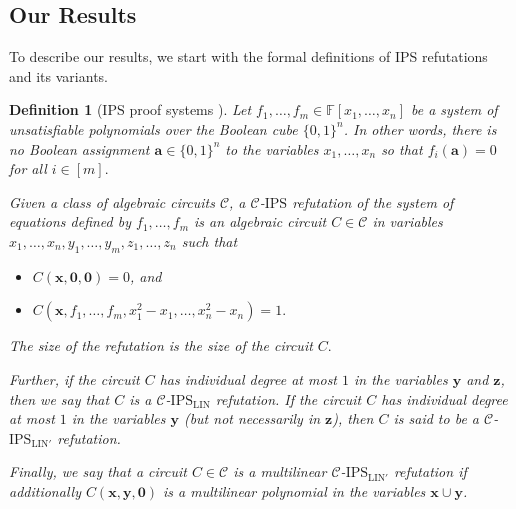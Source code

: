 \documentclass[11pt]{article}
\newtheorem{definition}[theorem]{Definition}
\newcommand{\Boo}{\{0,1 \}}
\newcommand{\F}{\mathbb{F}}
\newcommand{\IPS}{\mathrm{IPS}}
\newcommand{\IPSLIN}{\mathrm{IPS}_{\mathrm{LIN}}}
\newcommand{\IPSLINp}{\mathrm{IPS}_{\mathrm{LIN}'}}
\begin{document}

    
    
    
    








\subsection{Our Results}
\label{sec:results}
To describe our results, we start with the formal definitions of IPS refutations and its variants. 

\begin{definition}[$\IPS$ proof systems \cite{GP14, FSTW21}]
\label{def:proof-systems}
Let $f_1,\ldots, f_m \in \F[x_1,\ldots, x_n]$ be a system of unsatisfiable polynomials over the Boolean cube $\Boo^{n}$. In other words, there is no Boolean assignment $\mathbf{a} \in \{0,1\}^n$ to the variables $x_1,\ldots, x_n$ so that $f_i(\mathbf{a}) = 0$ for all $i\in [m].$

Given a class of algebraic circuits $\mathcal{C}$, a \emph{$\mathcal{C}$-$\IPS$ refutation} of the system of equations defined by $f_1,\ldots,f_m$ is an algebraic circuit $C\in \mathcal{C}$ in variables $x_1,\ldots,x_n,y_1,\ldots, y_m, z_1,\ldots, z_n$ such that
\begin{itemize}
    \item $C(\mathbf{x},\mathbf{0},\mathbf{0}) = 0$, and
    \item $C(\mathbf{x},f_1,\ldots,f_m,x_1^2-x_1,\ldots,x_n^2-x_n) = 1.$
\end{itemize}
The size of the refutation is the size of the circuit $C.$

Further, if the circuit $C$ has individual degree at most $1$ in the variables $\mathbf{y}$ and $\mathbf{z}$, then we say that $C$ is a \emph{$\mathcal{C}$-$\IPSLIN$ refutation}. If the circuit $C$ has individual degree at most $1$ in the variables $\mathbf{y}$ (but not necessarily in $\mathbf{z}$), then $C$ is said to be a \emph{$\mathcal{C}$-$\IPSLINp$ refutation.}

Finally, we say that a circuit $C\in \mathcal{C}$ is a \emph{multilinear $\mathcal{C}$-$\IPSLINp$ refutation} if additionally $C(\mathbf{x},\mathbf{y},\mathbf{0})$ is a multilinear polynomial in the variables $\mathbf{x}\cup \mathbf{y}$.
\end{definition}
\end{document}
